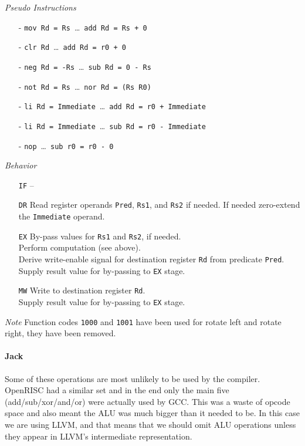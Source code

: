 \documentclass{IEEEtran}
\newcommand{\comment}[3]{\paragraph*{\textbf{#1}}{\color{#3}#2}}
\newcommand{\jack}[1]{\comment{Jack}{#1}{Magenta}}
\newcommand{\OR}{\textbar\xspace}
\newcommand{\NOT}{\texttildelow}
\begin{document}
\vspace{7mm}
\emph{Pseudo Instructions}
\begin{itemize}
  \item[-] \texttt{mov Rd = Rs}~\dots~\texttt{add Rd = Rs + 0}
  \item[-] \texttt{clr Rd}~\dots~\texttt{add Rd = r0 + 0}
  \item[-] \texttt{neg Rd = -Rs}~\dots~\texttt{sub Rd = 0 - Rs}
  \item[-] \texttt{not Rd = \NOT Rs}~\dots~\texttt{nor Rd = \NOT (Rs \OR R0)}
  \item[-] \texttt{li Rd = Immediate}~\dots~\texttt{add Rd = r0 + Immediate}
  \item[-] \texttt{li Rd = Immediate}~\dots~\texttt{sub Rd = r0 - Immediate}
  \item[-] \texttt{nop}~\dots~\texttt{sub r0 = r0 - 0}
\end{itemize}

\vspace{7mm}
\emph{Behavior}
\begin{itemize}
  \item[\texttt{IF}] --
  \item[\texttt{DR}] Read register operands \texttt{Pred}, \texttt{Rs1}, and
                     \texttt{Rs2} if needed. If needed zero-extend the
                     \texttt{Immediate} operand.
  \item[\texttt{EX}] By-pass values for \texttt{Rs1} and \texttt{Rs2}, if
                     needed. \\
                     Perform computation (see above). \\
                     Derive write-enable signal for destination register
                     \texttt{Rd} from predicate \texttt{Pred}. \\
                     Supply result value for by-passing to \texttt{EX} stage.
  \item[\texttt{MW}] Write to destination register \texttt{Rd}. \\
                     Supply result value for by-passing to \texttt{EX} stage.
\end{itemize}

\vspace{5mm}
\emph{Note}
Function codes \texttt{1000} and \texttt{1001} have been used for rotate left and rotate right, they have been removed.

\jack{Some of these operations are most unlikely to be used by the
compiler. OpenRISC had a similar set and in the end only the main
five (add/sub/xor/and/or) were actually used by GCC. This was
a waste of opcode space and also meant the ALU was much bigger
than it needed to be. In this case we are using LLVM, and that means
that we should omit ALU operations unless they appear in
LLVM's intermediate representation.}
\end{document}
